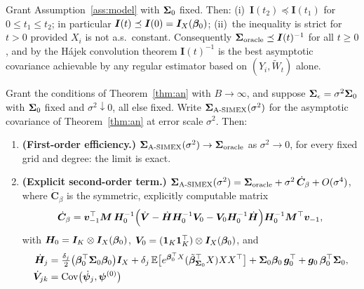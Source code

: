 \begin{lemma}\label{lem:info}
Grant Assumption~\ref{ass:model} with $\bm{\Sigma}_0$ fixed. Then:
(i)~$\bm I(t_2)\preceq\bm I(t_1)$ for $0\le t_1\le t_2$; in
particular $\bm I(t)\preceq\bm I(0)=\bm I_X(\bm{\beta}_0)$; (ii)~the
inequality is strict for $t>0$ provided $X_i$ is not a.s.\ constant.
Consequently
$\bm{\Sigma}_{\mathrm{oracle}}\preceq\bm I(t)^{-1}$ for all $t\ge0$, and by
the H\'ajek convolution theorem $\bm I(t)^{-1}$ is the best asymptotic
covariance achievable by any regular estimator based on
$(Y_i,\widetilde W_t)$ alone.
\end{lemma}

\begin{theorem}\label{thm:are}
Grant the conditions of Theorem~\ref{thm:an} with $B\to\infty$, and
suppose $\bm{\Sigma}_\epsilon=\sigma^2\bm{\Sigma}_0$ with $\bm{\Sigma}_0$ fixed and
$\sigma^2\downarrow0$, all else fixed. Write
$\bm{\Sigma}_{\textup{A-SIMEX}}(\sigma^2)$ for the asymptotic covariance of
Theorem~\ref{thm:an} at error scale $\sigma^2$. Then:
\begin{enumerate}\itemsep2pt
\item[(i)] \textbf{(First-order efficiency.)}
      $\bm{\Sigma}_{\textup{A-SIMEX}}(\sigma^2)\to\bm{\Sigma}_{\mathrm{oracle}}$ as
      $\sigma^2\to0$, for every fixed grid and degree: the limit is
      exact.
\item[(ii)] \textbf{(Explicit second-order term.)}
      $\bm{\Sigma}_{\textup{A-SIMEX}}(\sigma^2)
      =\bm{\Sigma}_{\mathrm{oracle}}+\sigma^2\,\dot{\bm C}_\beta+O(\sigma^4)$,
      where $\dot{\bm C}_\beta$ is the symmetric, explicitly
      computable matrix
      \begin{equation}\label{eq:cdot}
        \dot{\bm C}_\beta
        =\bm v_{-1}^\top\bm M\,\bm H_0^{-1}
        \Bigl(\dot{\bm{V}}-\dot{\bm{H}}\bm H_0^{-1}\bm V_0
              -\bm V_0\bm H_0^{-1}\dot{\bm{H}}\Bigr)
        \bm H_0^{-1}\bm M^\top\bm v_{-1},
      \end{equation}
      with $\bm H_0=\bm{I}_K\otimes\bm I_X(\bm{\beta}_0)$,
      $\bm V_0=(\bm 1_K\bm 1_K^\top)\otimes\bm I_X(\bm{\beta}_0)$, and
      \begin{align}
        \dot{\btH}_j
        &=\tfrac{\delta_j}{2}\bigl(\bet_0^\top\bSig_0\bet_0\bigr)\bm I_X
          +\delta_j\,\E\bigl[e^{\bet_0^\top X}
             (\tilde\bet_{\bSig_0}^\top X)XX^\top\bigr]
          +\bSig_0\bet_0\,\bm g_0^\top+\bm g_0\,\bet_0^\top\bSig_0,
          \label{eq:hdot}\\
        \dot{\btV}_{jk}
        &=\Cov\bigl(\dot{\bm\psi}_j,\bm\psi^{(0)}\bigr)

\end{align}
\end{enumerate}
\end{theorem}
